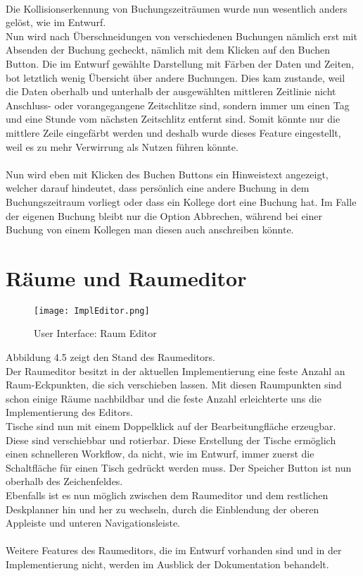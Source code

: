 \paragraph{}
Die Kollisionserkennung von Buchungszeiträumen wurde nun wesentlich anders gelöst, wie im Entwurf.
\\
Nun wird nach Überschneidungen von verschiedenen Buchungen nämlich erst mit Absenden der Buchung gecheckt, nämlich mit dem Klicken auf den Buchen Button.
Die im Entwurf gewählte Darstellung mit Färben der Daten und Zeiten, bot letztlich wenig Übersicht über andere Buchungen.
Dies kam zustande, weil die Daten oberhalb und unterhalb der ausgewählten mittleren Zeitlinie nicht Anschluss- oder vorangegangene Zeitschlitze sind,
sondern immer um einen Tag und eine Stunde vom nächsten Zeitschlitz entfernt sind. 
Somit könnte nur die mittlere Zeile eingefärbt werden und deshalb wurde dieses Feature eingestellt, weil es zu mehr Verwirrung als Nutzen führen könnte.
\paragraph{}
Nun wird eben mit Klicken des Buchen Buttons ein Hinweistext angezeigt, welcher darauf hindeutet, dass persönlich eine andere Buchung in dem Buchungszeitraum vorliegt oder dass ein Kollege dort eine Buchung hat.
Im Falle der eigenen Buchung bleibt nur die Option Abbrechen, während bei einer Buchung von einem Kollegen man diesen auch anschreiben könnte.

\newpage
\section{Räume und Raumeditor}

\begin{figure}[!h]
  \centering
  \texttt{[image: ImplEditor.png]}
  \caption{User Interface: Raum Editor}
  \label{fig:UI_Editor}
\end{figure}

Abbildung 4.5 zeigt den Stand des Raumeditors. 
\\
Der Raumeditor besitzt in der aktuellen Implementierung eine feste Anzahl an Raum-Eckpunkten, die sich verschieben lassen.
Mit diesen Raumpunkten sind schon einige Räume nachbildbar und die feste Anzahl erleichterte uns die Implementierung des Editors.
\\
Tische sind nun mit einem Doppelklick auf der Bearbeitungfläche erzeugbar. Diese sind verschiebbar und rotierbar.
Diese Erstellung der Tische ermöglich einen schnelleren Workflow, da nicht, wie im Entwurf, immer zuerst die Schaltfläche für einen Tisch gedrückt werden muss.
Der Speicher Button ist nun oberhalb des Zeichenfeldes. 
\\
Ebenfalls ist es nun möglich zwischen dem Raumeditor und dem restlichen Deskplanner hin und her zu wechseln, durch die Einblendung der oberen Appleiste und unteren Navigationsleiste.
\\\\
Weitere Features des Raumeditors, die im Entwurf vorhanden sind und in der Implementierung nicht, werden im Ausblick der Dokumentation behandelt.


